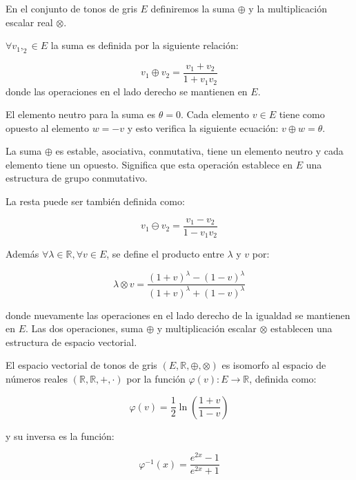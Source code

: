 En el conjunto de tonos de gris $E$ definiremos la suma $\oplus$ y la multiplicación escalar real $\otimes$.

$\forall v_1,_2 \in E$ la suma es definida por la siguiente relaci\'on:

\begin{equation}
	v_1 \oplus v_2=\frac{v_1+v_2}{1+v_1v_2}
\end{equation}
donde las operaciones en el lado derecho se mantienen en $E$.

El elemento neutro para la suma es $\theta = 0$. Cada elemento $v \in E$ tiene como opuesto al elemento $w = - v$ y esto verifica la siguiente ecuación: $v \oplus w = \theta$.

La suma $\oplus$ es estable, asociativa, conmutativa, tiene un elemento neutro y cada elemento tiene un opuesto. Significa que esta operación establece en $E$ una estructura de grupo conmutativo.

La resta puede ser tambi\'en definida como:

\begin{equation}
	v_1\ominus v_2=\frac{v_1-v_2}{1-v_1v_2}
\end{equation}

Adem\'as $\forall \lambda \in \mathbb{R}, \forall v \in E $, se define el producto entre $\lambda$ y $v$ por:
 
\begin{equation}
	\lambda \otimes v =\frac{(1+v)^\lambda-(1-v)^\lambda}{(1+v)^\lambda+(1-v)^\lambda}
\end{equation}

donde nuevamente las operaciones en el lado derecho de la igualdad se mantienen en $E$. Las dos operaciones, suma $\oplus$ y multiplicación escalar $\otimes$ establecen una estructura de espacio vectorial.

El espacio vectorial de tonos de gris $(E, \mathbb{R}, \oplus, \otimes)$ es isomorfo al espacio de números reales $(\mathbb{R},\mathbb{R}, +, \cdot)$ por la función $\varphi(v) : E \rightarrow \mathbb{R}$, definida como:

\begin{equation}
	\varphi(v)=\frac{1}{2}\ln\left(\frac{1+v}{1-v}\right)
\end{equation}

y su inversa es la funci\'on:

\begin{equation}
	\varphi^{-1}(x)=\frac{e^{2x}-1}{e^{2x}+1}
\end{equation}

